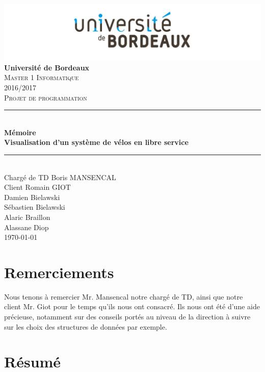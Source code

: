 \documentclass[12pt]{article}
\begin{document}
	\begin{titlepage}
		\includegraphics[scale=0.2]{logo_bordeaux.png}\\
		\centering
		\linebreak
		{\LARGE \bfseries Université de Bordeaux}\\ [2cm]
		\textsc{\Large Master 1 Informatique}\\ [0,3cm]
		\textsc{\Large 2016/2017}\\ [1,4cm]

		\textsc{\Large Projet de programmation}\\ [1.4cm]

		\rule{16cm}{1mm}\\ [0,7cm]
		{\huge \bfseries Mémoire}\\ [0,5cm]
		{\huge \bfseries Visualisation d'un système de vélos en libre service} \\[0,7cm]
		\rule{16cm}{1mm}\\ [1cm]

		{\Large Chargé de TD Boris MANSENCAL }\\ [0,3cm]
		{\Large Client Romain GIOT }\\ [1cm]

		{\Large Damien Bielawski }\\ [0,3cm]
		{\Large Sébastien Bielawski }\\[0,3cm]
		{\Large Alaric Braillon }\\ [0,3cm]
		{\Large Alassane Diop }\\ [2cm]
		\Large\today

	\end{titlepage}

\newpage
\section*{Remerciements} 
	Nous tenons à remercier Mr. Mansencal notre chargé de TD, ainsi que notre client Mr. Giot
	pour le temps qu'ils nous ont consacré. Ils nous ont été d'une aide précieuse, notamment
	sur des conseils portés au niveau de la direction à suivre sur les choix des structures de
	données	par exemple.	
	
\newpage
\section*{Résumé}
\end{document}
